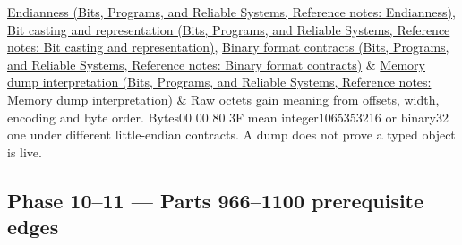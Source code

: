 {\begin{longtable}[]
\href{../01-Bits-Programs-and-Reliable-Systems/main.pdf\#nameddest=appendix-bc07c3d25b18}{Endianness (Bits, Programs, and Reliable Systems, Reference notes: Endianness)}, \href{../01-Bits-Programs-and-Reliable-Systems/main.pdf\#nameddest=appendix-34ee45f161c1}{Bit casting and representation (Bits, Programs, and Reliable Systems, Reference notes: Bit casting and representation)}, \href{../01-Bits-Programs-and-Reliable-Systems/main.pdf\#nameddest=appendix-590bbb2424c1}{Binary format contracts (Bits, Programs, and Reliable Systems, Reference notes: Binary format contracts)} & \href{../01-Bits-Programs-and-Reliable-Systems/main.pdf\#nameddest=appendix-230b59c0676b}{Memory dump interpretation (Bits, Programs, and Reliable Systems, Reference notes: Memory dump interpretation)} & Raw octets gain meaning from offsets, width, encoding and byte order. Bytes00 00 80 3F mean integer1065353216 or binary32 one under different little-endian contracts. A dump does not prove a typed object is live. \\
\end{longtable}
}

\subsection{Phase 10--11 --- Parts 966--1100 prerequisite edges}\label{appendix-4ad47bdd269a-phase-1011-parts-9661100-prerequisite-edges}

\hypertarget{appendix-4ad47bdd269a-phase-1011-parts-9661100-prerequisite-edges}{}

